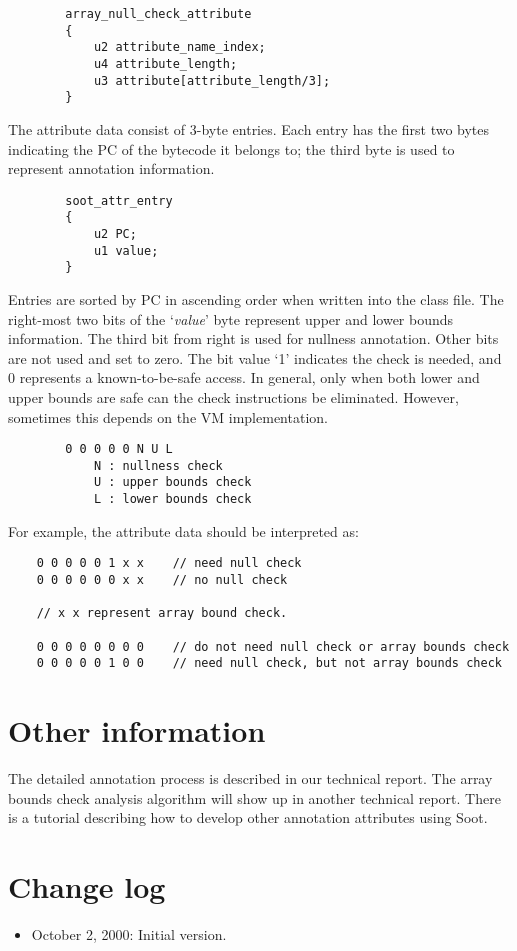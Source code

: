 \documentclass{article}
\begin{document}
\begin{verbatim}
        array_null_check_attribute
        {
            u2 attribute_name_index;
            u4 attribute_length;
            u3 attribute[attribute_length/3];
        }
\end{verbatim}

The attribute data consist of 3-byte entries. Each entry has the first two 
bytes indicating the PC of the bytecode it belongs to; the third byte is 
used to represent annotation information.

\begin{verbatim}
        soot_attr_entry
        {
            u2 PC;
            u1 value;
        }
\end{verbatim}

Entries are sorted by PC in ascending order when written into the class
file. The right-most two bits of the `{\em value}' byte represent
upper and lower bounds information. The third bit from right is used
for nullness annotation.  Other bits are not used and set to zero. The
bit value `1' indicates the check is needed, and 0 represents a
known-to-be-safe access. In general, only when both lower and upper
bounds are safe can the check instructions be eliminated. However,
sometimes this depends on the VM implementation.

\begin{verbatim}
        0 0 0 0 0 N U L
            N : nullness check
            U : upper bounds check
            L : lower bounds check  
\end{verbatim}

For example, the attribute data should be interpreted as:
\begin{verbatim}
    0 0 0 0 0 1 x x    // need null check
    0 0 0 0 0 0 x x    // no null check

    // x x represent array bound check.

    0 0 0 0 0 0 0 0    // do not need null check or array bounds check
    0 0 0 0 0 1 0 0    // need null check, but not array bounds check
\end{verbatim}

          
\section*{Other information}
The detailed annotation process is described in our technical report. 
The array bounds check analysis algorithm will show up in another 
technical report. There is a tutorial describing how to develop
other annotation attributes using Soot.

\section*{Change log}
\begin{itemize}
\item October 2, 2000: Initial version.
\end{itemize}
\end{document}
